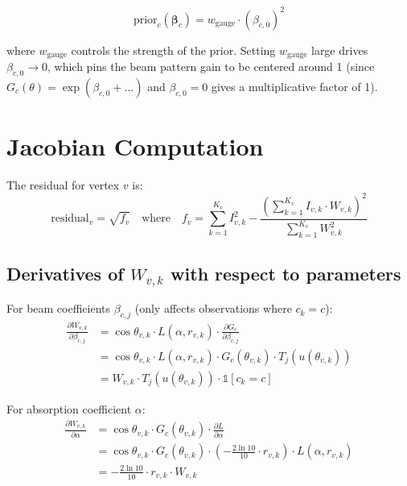 \documentclass[11pt]{article}
\begin{document}
\begin{equation*}
\text{prior}_c(\bm{\beta}_c) = w_{\text{gauge}} \cdot (\beta_{c,0})^2
\end{equation*}

where $w_{\text{gauge}}$ controls the strength of the prior. Setting $w_{\text{gauge}}$ large drives $\beta_{c,0} \to 0$, which pins the beam pattern gain to be centered around 1 (since $G_c(\theta) = \exp(\beta_{c,0} + \dots)$ and $\beta_{c,0} = 0$ gives a multiplicative factor of 1).

\section{Jacobian Computation}

The residual for vertex $v$ is:
\begin{equation*}
\text{residual}_v = \sqrt{f_v} \quad \text{where} \quad f_v = \sum_{k=1}^{K_v} I_{v,k}^2 - \frac{\left(\sum\limits_{k=1}^{K_v} I_{v,k} \cdot W_{v,k}\right)^2}{\sum\limits_{k=1}^{K_v} W_{v,k}^2}
\end{equation*}

\subsection{Derivatives of $W_{v,k}$ with respect to parameters}

For beam coefficients $\beta_{c,j}$ (only affects observations where $c_k = c$):
\begin{align*}
\frac{\partial W_{v,k}}{\partial \beta_{c,j}} &= \cos\theta_{v,k} \cdot L(\alpha, r_{v,k}) \cdot \frac{\partial G_c}{\partial \beta_{c,j}} \\
&= \cos\theta_{v,k} \cdot L(\alpha, r_{v,k}) \cdot G_c(\theta_{v,k}) \cdot T_j(u(\theta_{v,k})) \\
&= W_{v,k} \cdot T_j(u(\theta_{v,k})) \cdot \mathbb{1}[c_k = c]
\end{align*}

For absorption coefficient $\alpha$:
\begin{align*}
\frac{\partial W_{v,k}}{\partial \alpha} &= \cos\theta_{v,k} \cdot G_c(\theta_{v,k}) \cdot \frac{\partial L}{\partial \alpha} \\
&= \cos\theta_{v,k} \cdot G_c(\theta_{v,k}) \cdot \left(-\frac{2\ln 10}{10} \cdot r_{v,k}\right) \cdot L(\alpha, r_{v,k}) \\
&= -\frac{2\ln 10}{10} \cdot r_{v,k} \cdot W_{v,k}
\end{align*}
\end{document}
